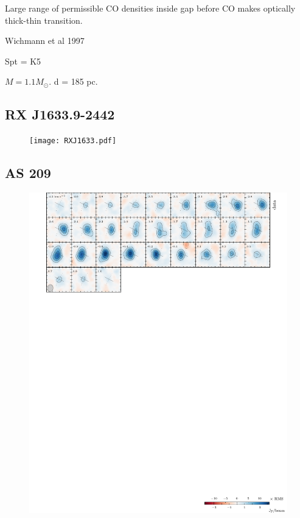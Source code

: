 \documentclass[twocolumn]{aastex6}
\begin{document}
Large range of permissible CO densities inside gap before CO makes optically thick-thin transition.

\citep{andrews11}
Wichmann et al 1997

Spt = K5

$M = 1.1 M_\odot$.
d = 185 pc.

\subsection{RX J1633.9-2442}

\begin{figure}[htb]
\begin{center}
  \texttt{[image: RXJ1633.pdf]}
  \end{center}
\end{figure}

\subsection{AS 209}



\begin{figure}[htb]
\begin{center}
  \includegraphics[draft]{AS209.pdf}
  \end{center}
\end{figure}
\end{document}
